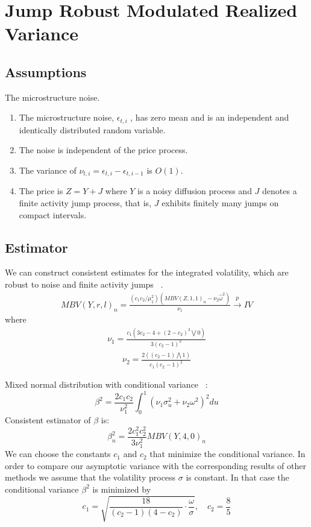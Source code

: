 \documentclass[letterpaper]{report}
\begin{document}
\section{Jump Robust Modulated Realized Variance}
\subsection{Assumptions}
The microstructure noise.
\begin{enumerate}
\item The microstructure noise, $\epsilon_{t,i}$ , has zero mean and is an
independent and identically distributed random variable.
\item The noise is independent of the price process.
\item The variance of $\nu_{t,i} = \epsilon_{t,i} - \epsilon_{t,i-1}$ is
$O(1)$.
\item The price is $Z = Y + J$ where $Y$ is a noisy diffusion process and $J$ denotes a finite activity jump
process, that is, $J$ exhibits finitely many jumps on compact intervals.
\end{enumerate}
\subsection{Estimator}
We can construct consistent estimates for the integrated volatility, which are robust to noise and finite activity jumps
~\cite[Podolskij and Vetter, 2009]{Podolskij_Vetter}.
\begin{gather}
MBV(Y,r,l)_n =\frac{(c_1 c_2/\mu_1^2)(MBV(Z,1,1)_n-\nu_2\hat{\omega}^2)}{\nu_1} \stackrel{p}{\to} IV
\end{gather}
where
\begin{gather}
\nu_1 = \frac{c_1(3c_2-4+(2-c_2)^3\bigvee 0)}{3(c_2-1)^2}
\end{gather}
\begin{gather}
\nu_2 = \frac{2((c_2-1)\bigwedge 1)}{c_1(c_2-1)^2}
\end{gather}

Mixed normal distribution with conditional variance ~\cite[Podolskij and Vetter, 2009]{Podolskij_Vetter}:
\begin{equation}
\beta^2 = \frac{2c_1 c_2}{\nu^2_1}\int_0^1(\nu_1\sigma_u^2+\nu_2\omega^2)^2du
\end{equation}
Consistent estimator of $\beta$ is:
\begin{equation}
\beta^2_n = \frac{2c_1^2 c_2^2}{3\nu^2_1}MBV(Y,4,0)_n
\end{equation}
We can choose the constants $c_1$ and
$c_2$ that minimize the conditional variance. In order to compare our asymptotic variance
with the corresponding results of other methods we assume that the volatility process $\sigma$
is constant. In that case the conditional variance $\beta^2$ is minimized by
\begin{equation}
c_1 = \sqrt{\frac{18}{(c_2-1)(4-c_2)}\cdot\frac{\omega}{\sigma}}, \quad
c_2 = \frac{8}{5}
\end{equation}
\end{document}
